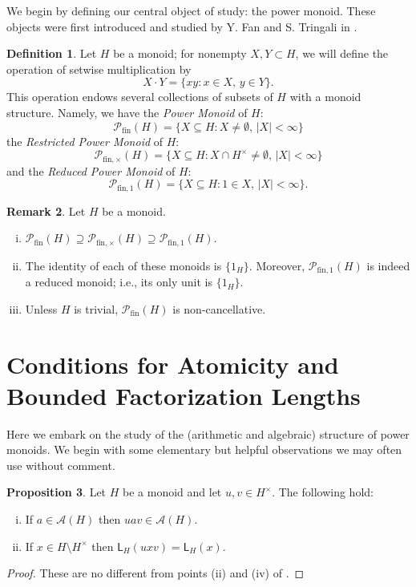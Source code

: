 \documentclass{report}
\renewcommand{\P}{\mathcal{P}}
\newcommand{\fin}{\textrm{fin}}
\newcommand{\funt}{{\textrm{fin}, \times}}
\newcommand{\fun}{{\textrm{fin}, 1}}
\renewcommand{\:}{\text{:}}
\theoremstyle{definition}
\newtheorem{defn}{Definition}[section]
\newtheorem{prop}[defn]{Proposition}
\newtheorem{rk}[defn]{Remark}
\begin{document}
We begin by defining our central object of study: the power monoid.
These objects were first introduced and studied by Y. Fan and S. Tringali in \cite{fan-tringali18}.

\begin{defn}
Let $H$ be a monoid; for nonempty $X,Y\subset H$, we will define the operation of setwise multiplication by
\[X \cdot Y = \{xy : x\in X,\, y\in Y \}. \]
This operation endows several collections of subsets of $H$ with a monoid structure.  
Namely, we have the \textit{Power Monoid} of $H$:
\[ \P_\fin(H) = \{ X \subseteq H: X\neq \emptyset,\, |X| < \infty \}\]
the \textit{Restricted Power Monoid} of $H$:
\[ \P_\funt(H) = \{ X \subseteq H: X \cap H^\times \neq \emptyset,\,|X| < \infty \} \]
and the \textit{Reduced Power Monoid} of $H$:
\[ \P_\fun(H) = \{ X \subseteq H: 1\in X, \,  |X| < \infty \}. \]
\end{defn}

\begin{rk} Let $H$ be a monoid.
\begin{enumerate}[(i)] 
\item $\P_\fin(H) \supseteq \P_\funt(H) \supseteq \P_\fun(H)$.
\item The identity of each of these monoids is $\{1_H\}$.
Moreover, $\P_\fun(H)$ is indeed a reduced monoid; i.e., its only unit is $\{1_H\}$.
\item Unless $H$ is trivial, $\P_\fin(H)$ is non-cancellative.
\end{enumerate}
\end{rk}

\section{Conditions for Atomicity and Bounded Factorization Lengths} \label{sec:boundaries}



Here we embark on the study of the (arithmetic and algebraic) structure of power monoids.
We begin with some elementary but helpful observations we may often use without comment.
%
\begin{prop}\label{prop:unit-adjust}
Let $H$ be a monoid and let $u,v\in H^\times$.  
The following hold:
\begin{enumerate}[(i)]
\item\label{prop:unit-adjust(i)} If $a\in \mathscr{A}(H)$ then $uav\in \mathscr{A}(H)$.
\item\label{prop:unit-adjust(ii)} If $x\in H\setminus H^\times$ then $\mathsf{L}_H(uxv) = \mathsf{L}_H(x)$.
\end{enumerate}
\end{prop}
%
\begin{proof}
These are no different from points (ii) and (iv) of \cite[Lemma 2.2]{fan-tringali18}.
\end{proof}
\end{document}
